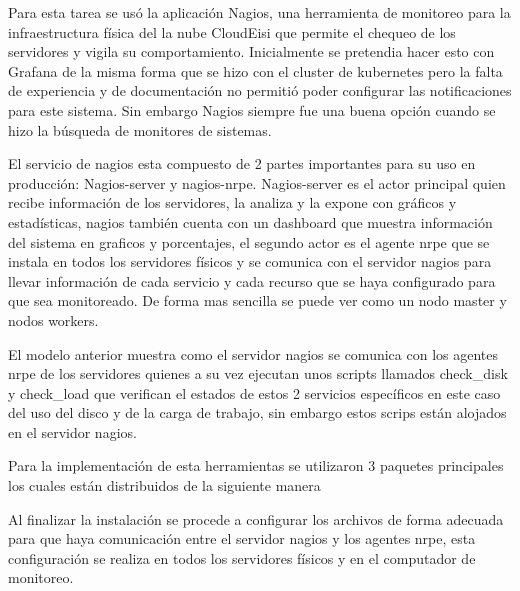     Para esta tarea se usó la aplicación Nagios, una herramienta de monitoreo para la infraestructura física del la nube CloudEisi que permite el chequeo de los servidores y vigila su comportamiento. Inicialmente se pretendia hacer esto con Grafana de la misma forma que se hizo con el cluster de kubernetes pero la falta de experiencia y de documentación no permitió poder configurar las notificaciones para este sistema. Sin embargo Nagios siempre fue una buena opción cuando se hizo la búsqueda de monitores de sistemas.
    
     
    
     
     
     El servicio de nagios esta compuesto de 2 partes importantes para su uso en producción: Nagios-server y nagios-nrpe.
   Nagios-server es el actor principal quien recibe información de los servidores, la analiza y la expone con gráficos y estadísticas, nagios también cuenta con un dashboard que muestra información del sistema en graficos y  porcentajes, el segundo actor es el agente nrpe que se instala en todos los servidores físicos y se comunica con el servidor nagios para llevar información de cada servicio y cada recurso que se haya configurado para que sea monitoreado. De forma mas sencilla se puede ver como un nodo master y nodos workers.
   
   
   
   El modelo anterior muestra como el servidor nagios se comunica con los agentes nrpe de los servidores quienes a su vez ejecutan unos scripts llamados check\_disk y check\_load que verifican el estados de estos 2 servicios específicos en este caso del uso del disco y de la carga de trabajo, sin embargo estos scrips están alojados en el servidor nagios.
   
   Para la implementación de esta herramientas se utilizaron 3 paquetes principales los cuales están distribuidos de la siguiente manera 
   
     
   
   
   Al finalizar la instalación se procede a configurar los archivos de forma adecuada para que haya comunicación entre el servidor nagios y los agentes nrpe, esta configuración se realiza en todos los servidores físicos y en el computador de monitoreo.
   
